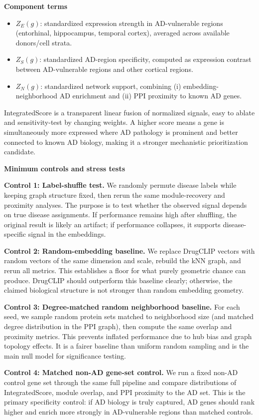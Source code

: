 \documentclass{article}
\begin{document}
\textbf{Component terms}
\begin{itemize}
    \item $Z_E(g)$: standardized expression strength in AD-vulnerable regions (entorhinal, hippocampus, temporal cortex), averaged across available donors/cell strata.
    \item $Z_S(g)$: standardized AD-region specificity, computed as expression contrast between AD-vulnerable regions and other cortical regions.
    \item $Z_N(g)$: standardized network support, combining (i) embedding-neighborhood AD enrichment and (ii) PPI proximity to known AD genes.
\end{itemize}
IntegratedScore is a transparent linear fusion of normalized signals, easy to ablate and sensitivity-test by changing weights. A higher score means a gene is simultaneously more expressed where AD pathology is prominent and better connected to known AD biology, making it a stronger mechanistic prioritization candidate.

\newpage
\textbf{Minimum controls and stress tests}

\textbf{Control 1: Label-shuffle test.}
We randomly permute disease labels while keeping graph structure fixed, then rerun the same module-recovery and proximity analyses. The purpose is to test whether the observed signal depends on true disease assignments. If performance remains high after shuffling, the original result is likely an artifact; if performance collapses, it supports disease-specific signal in the embeddings.

\textbf{Control 2: Random-embedding baseline.}
We replace DrugCLIP vectors with random vectors of the same dimension and scale, rebuild the kNN graph, and rerun all metrics. This establishes a floor for what purely geometric chance can produce. DrugCLIP should outperform this baseline clearly; otherwise, the claimed biological structure is not stronger than random embedding geometry.

\textbf{Control 3: Degree-matched random neighborhood baseline.}
For each seed, we sample random protein sets matched to neighborhood size (and matched degree distribution in the PPI graph), then compute the same overlap and proximity metrics. This prevents inflated performance due to hub bias and graph topology effects. It is a fairer baseline than uniform random sampling and is the main null model for significance testing.

\textbf{Control 4: Matched non-AD gene-set control.}
We run a fixed non-AD control gene set through the same full pipeline and compare distributions of IntegratedScore, module overlap, and PPI proximity to the AD set. This is the primary specificity control: if AD biology is truly captured, AD genes should rank higher and enrich more strongly in AD-vulnerable regions than matched controls.
\end{document}
